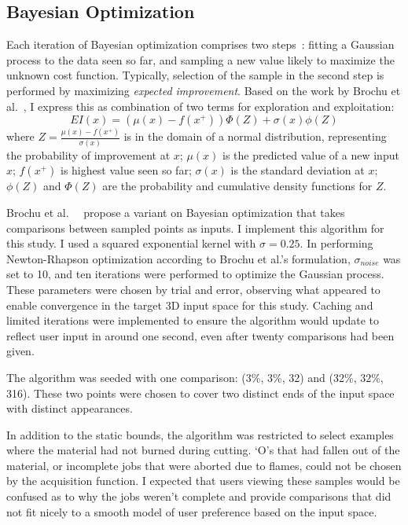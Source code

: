 \subsection{Bayesian Optimization}

Each iteration of Bayesian optimization comprises two steps~\cite{brochu_tutorial_2010}:
fitting a Gaussian process to the data seen so far, and sampling a new value likely to maximize the unknown cost function.
Typically, selection of the sample in the second step is performed by maximizing \emph{expected improvement}.
Based on the work by Brochu et al.~\cite{brochu_tutorial_2010}, I express this as combination of two terms for exploration and exploitation:
\begin{equation}
EI (x) = (\mu(x) - f (x^+)) \Phi(Z) + \sigma(x) \phi(Z)
\end{equation}
where $Z = \frac{\mu(x) - f(x^+)}{\sigma(x)}$ is in the domain of a normal distribution, representing the probability of improvement at $x$;
$\mu(x)$ is the predicted value of a new input $x$;
$f(x^+)$ is highest value seen so far;
$\sigma(x)$ is the standard deviation at $x$;
$\phi(Z)$ and $\Phi(Z)$ are the probability and cumulative density functions for $Z$.

Brochu et al.~\cite{brochu_tutorial_2010}~\cite{brochu_active_2008} propose a variant on Bayesian optimization that takes comparisons between sampled points as inputs.
I implement this algorithm for this study.
I used a squared exponential kernel with $\sigma = 0.25$.
In performing Newton-Rhapson optimization according to Brochu et al.'s formulation, $\sigma_{noise}$ was set to 10, and ten iterations were performed to optimize the Gaussian process.
These parameters were chosen by trial and error, observing what appeared to enable convergence in the target 3D input space for this study.
Caching and limited iterations were implemented to ensure the algorithm would update to reflect user input in around one second, even after twenty comparisons had been given.

The algorithm was seeded with one comparison:
(3\%, 3\%, 32) and
(32\%, 32\%, 316).
These two points were chosen to cover two distinct ends of the input space with distinct appearances.

In addition to the static bounds, the algorithm was restricted to select examples where the material had not burned during cutting.
`O's that had fallen out of the material, or incomplete jobs that were aborted due to flames, could not be chosen by the acquisition function.
I expected that users viewing these samples would be confused as to why the jobs weren't complete and provide comparisons that did not fit nicely to a smooth model of user preference based on the input space.
